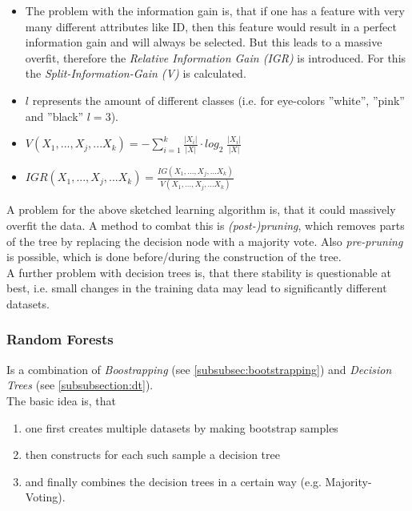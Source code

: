 \documentclass[12pt,a4paper]{article}
\begin{document}
\begin{itemize}
\begin{itemize}
            \item The problem with the information gain is, that if one has a feature with very many different attributes like ID, then this feature would result in a perfect information gain and will always be selected. But this leads to a massive overfit, therefore the \textit{Relative Information Gain (IGR)} is introduced. For this the \textit{Split-Information-Gain (V)} is calculated.
            \item \(l\) represents the amount of different classes (i.e. for eye-colors ''white'', ''pink'' and ''black'' \(l = 3\)).
            \item \(V(X_1,...,X_j,...X_k) = - \sum_{i=1}^k \frac{|X_i|}{|X|} \cdot log_2 \;  \frac{|X_i|}{|X|}\)
            \item \(IGR(X_1,...,X_j,...X_k) = \frac{IG(X_1,...,X_j,...X_k)}{V(X_1,...,X_j,...X_k)}\)
        \end{itemize}
\end{itemize}

\noindent A problem for the above sketched learning algorithm is, that it could massively overfit the data. A method to combat this is \textit{(post-)pruning}, which removes parts of the tree by replacing the decision node with a majority vote. Also \textit{pre-pruning} is possible, which is done before/during the construction of the tree.\\
A further problem with decision trees is, that there stability is questionable at best, i.e. small changes in the training data may lead to significantly different datasets.

\subsubsection{Random Forests}

\noindent Is a combination of \textit{Boostrapping} (see \ref{subsubsec:bootstrapping}) and \textit{Decision Trees} (see \ref{subsubsection:dt}).\\
The basic idea is, that

\begin{enumerate}
    \item one first creates multiple datasets by making bootstrap samples
    \item then constructs for each such sample a decision tree
    \item and finally combines the decision trees in a certain way (e.g. Majority-Voting). 
\end{enumerate}
\end{document}
